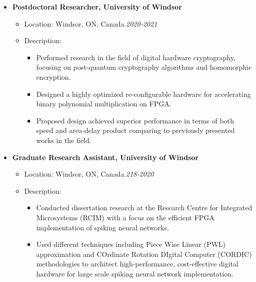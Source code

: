\begin {itemize}
\begin {itemize}
\begin {itemize}
\begin {itemize}
                         \end {itemize}
            \end {itemize} \vspace{0.3cm}
     \item [$\bullet$] \bf {\mtf \normalsize Postdoctoral Researcher, University of Windsor} \mdseries
            \begin {itemize}
                \item [-]  {  Location:  Windsor, ON, Canada.\small \hspace{5.4cm}\textit{2020-2021}\normalsize} 
                \item [-]   {   Description:} 
                         \begin {itemize}
                                \item [\textbullet] Performed research in the field of digital hardware cryptography, focusing on post-quantum cryptography algorithms and homomorphic encryption.
                                \item [\textbullet] Designed a highly optimized re-configurable hardware for accelerating binary polynomial multiplication on FPGA.
                                \item [\textbullet] Proposed design achieved superior performance in terms of both speed and area-delay product comparing to previously presented works in the field.
                         \end {itemize}
            \end {itemize} \vspace{0.3cm}
     \item [$\bullet$] \bf {\mtf \normalsize Graduate Research Assistant, University of Windsor} \mdseries
                \begin {itemize}
                \item [-]  {  Location:  Windsor, ON, Canada.\small \hspace{5.4cm}\textit{218-2020}\normalsize} 
                \item [-]   {   Description:} 
                         \begin {itemize}
                                \item [\textbullet]  Conducted  dissertation research at the Research Centre for Integrated Microsystems (RCIM) with a focus on the efficient FPGA implementation of spiking neural networks.
                                \item [\textbullet]  Used different techniques including Piece Wise Linear (PWL) approximation and COrdinate Rotation DIgital Computer (CORDIC) methodologies to architect high-performance, cost-effective digital hardware  for large scale spiking neural network implementation.

\end{itemize}
\end{itemize}
\end{itemize}
\end{itemize}

